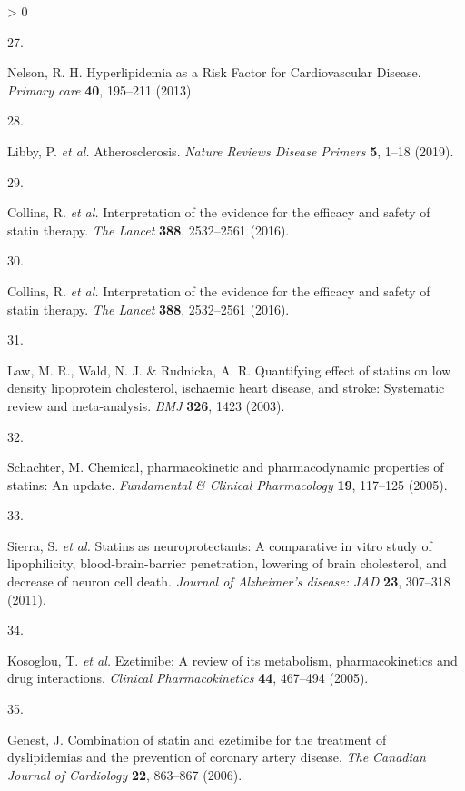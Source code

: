 \documentclass[a4paper, twoside]{templates/ociamthesis}
\newlength{\cslhangindent}
\newlength{\csllabelwidth}
\newenvironment{CSLReferences}[3] %
 {%
  \setlength{\parindent}{0pt}
  \ifodd #1 \everypar{\setlength{\hangindent}{\cslhangindent}}\ignorespaces\fi
  \ifnum #2 > 0
  \setlength{\parskip}{#2\baselineskip}
  \fi
 }%
 {}
\newcommand{\CSLLeftMargin}[1]{\parbox[t]{\maxof{\widthof{#1}}{\csllabelwidth}}{#1}}
\newcommand{\CSLRightInline}[1]{\parbox[t]{\linewidth - \csllabelwidth}{#1}}
\begin{document}
\begin{CSLReferences}{0}{0}
\leavevmode\hypertarget{ref-nelson2013}{}%
\CSLLeftMargin{27. }
\CSLRightInline{Nelson, R. H. Hyperlipidemia as a {Risk Factor} for {Cardiovascular Disease}. \emph{Primary care} \textbf{40}, 195--211 (2013).}

\leavevmode\hypertarget{ref-libby2019}{}%
\CSLLeftMargin{28. }
\CSLRightInline{Libby, P. \emph{et al.} Atherosclerosis. \emph{Nature Reviews Disease Primers} \textbf{5}, 1--18 (2019).}

\leavevmode\hypertarget{ref-collins2016}{}%
\CSLLeftMargin{29. }
\CSLRightInline{Collins, R. \emph{et al.} Interpretation of the evidence for the efficacy and safety of statin therapy. \emph{The Lancet} \textbf{388}, 2532--2561 (2016).}

\leavevmode\hypertarget{ref-collins2016a}{}%
\CSLLeftMargin{30. }
\CSLRightInline{Collins, R. \emph{et al.} Interpretation of the evidence for the efficacy and safety of statin therapy. \emph{The Lancet} \textbf{388}, 2532--2561 (2016).}

\leavevmode\hypertarget{ref-law2003}{}%
\CSLLeftMargin{31. }
\CSLRightInline{Law, M. R., Wald, N. J. \& Rudnicka, A. R. Quantifying effect of statins on low density lipoprotein cholesterol, ischaemic heart disease, and stroke: Systematic review and meta-analysis. \emph{BMJ} \textbf{326}, 1423 (2003).}

\leavevmode\hypertarget{ref-schachter2005}{}%
\CSLLeftMargin{32. }
\CSLRightInline{Schachter, M. Chemical, pharmacokinetic and pharmacodynamic properties of statins: An update. \emph{Fundamental \& Clinical Pharmacology} \textbf{19}, 117--125 (2005).}

\leavevmode\hypertarget{ref-sierra2011}{}%
\CSLLeftMargin{33. }
\CSLRightInline{Sierra, S. \emph{et al.} Statins as neuroprotectants: A comparative in vitro study of lipophilicity, blood-brain-barrier penetration, lowering of brain cholesterol, and decrease of neuron cell death. \emph{Journal of Alzheimer's disease: JAD} \textbf{23}, 307--318 (2011).}

\leavevmode\hypertarget{ref-kosoglou2005}{}%
\CSLLeftMargin{34. }
\CSLRightInline{Kosoglou, T. \emph{et al.} Ezetimibe: A review of its metabolism, pharmacokinetics and drug interactions. \emph{Clinical Pharmacokinetics} \textbf{44}, 467--494 (2005).}

\leavevmode\hypertarget{ref-genest2006}{}%
\CSLLeftMargin{35. }
\CSLRightInline{Genest, J. Combination of statin and ezetimibe for the treatment of dyslipidemias and the prevention of coronary artery disease. \emph{The Canadian Journal of Cardiology} \textbf{22}, 863--867 (2006).}


\end{CSLReferences}
\end{document}
